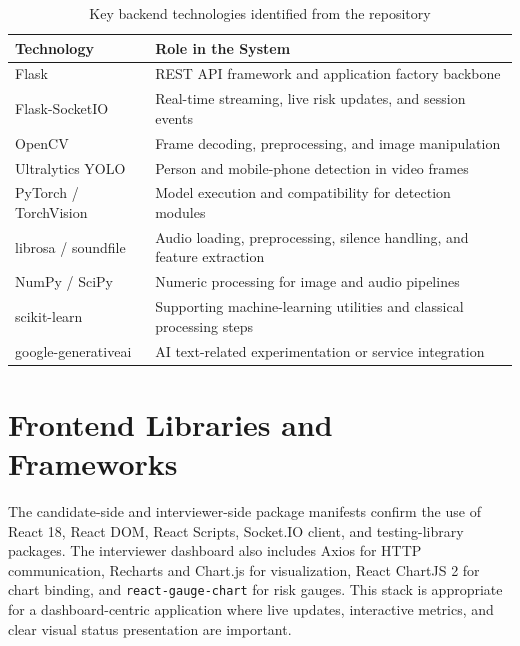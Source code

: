 \documentclass[12pt,a4paper]{extreport}
\begin{document}
\begin{table}[H]
\centering
\caption{Key backend technologies identified from the repository}
\begin{tabularx}{\textwidth}{p{3.5cm}X}
\toprule
\textbf{Technology} & \textbf{Role in the System}\\
\midrule
Flask & REST API framework and application factory backbone\\
Flask-SocketIO & Real-time streaming, live risk updates, and session events\\
OpenCV & Frame decoding, preprocessing, and image manipulation\\
Ultralytics YOLO & Person and mobile-phone detection in video frames\\
PyTorch / TorchVision & Model execution and compatibility for detection modules\\
librosa / soundfile & Audio loading, preprocessing, silence handling, and feature extraction\\
NumPy / SciPy & Numeric processing for image and audio pipelines\\
scikit-learn & Supporting machine-learning utilities and classical processing steps\\
google-generativeai & AI text-related experimentation or service integration\\
\bottomrule
\end{tabularx}
\end{table}

\section{Frontend Libraries and Frameworks}
The candidate-side and interviewer-side package manifests confirm the use of React 18, React DOM, React Scripts, Socket.IO client, and testing-library packages. The interviewer dashboard also includes Axios for HTTP communication, Recharts and Chart.js for visualization, React ChartJS 2 for chart binding, and \texttt{react-gauge-chart} for risk gauges. This stack is appropriate for a dashboard-centric application where live updates, interactive metrics, and clear visual status presentation are important.
\end{document}

